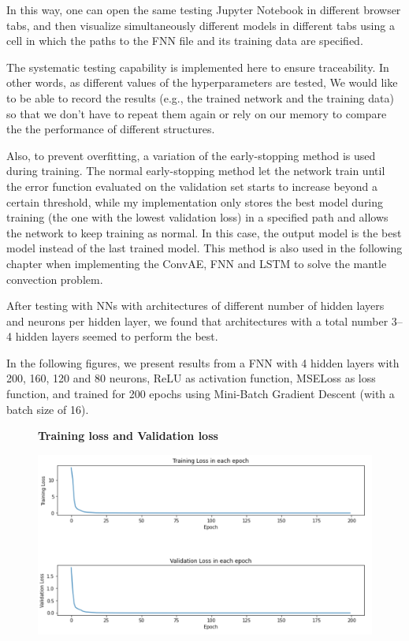 In this way, one can open the same testing Jupyter Notebook in different browser tabs, and then visualize simultaneously different models in different tabs using a cell in which the paths to the FNN file and its training data are specified. 

The systematic testing capability is implemented here to ensure traceability. In other words, as different values of the hyperparameters are tested, We would like to be able to record the results (e.g., the trained network and the training data) so that we don't have to repeat them again or rely on our memory to compare the the performance of different structures.

Also, to prevent overfitting, a variation of the early-stopping method is used during training. The normal early-stopping method let the network train until the error function evaluated on the validation set starts to increase beyond a certain threshold\citep{10.1007_978-3-642-35289-8_5}, while my implementation only stores the best model during training (the one with the lowest validation loss) in a specified path and allows the network to keep training as normal. In this case, the output model is the best model instead of the last trained model. This method is also used in the following chapter when implementing the ConvAE, FNN and LSTM to solve the mantle convection problem.

After testing with NNs with architectures of different number of hidden layers and neurons per hidden layer, we found that architectures with a total number 3–4 hidden layers seemed to perform the best.

In the following figures, we present results from a FNN with 4 hidden layers with 200, 160, 120 and 80 neurons, ReLU as activation function, MSELoss as loss function, and trained for 200 epochs using Mini-Batch Gradient Descent (with a batch size of 16).

\begin{figure}[H]
    \textbf{Training loss and Validation loss}\par\medskip
    \includegraphics[scale=0.6]{Report LaTeX/figures/geoid_images/Geoid_trainingData.png}
\end{figure}

